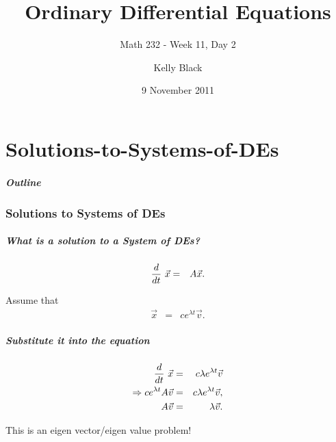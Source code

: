 \part{Solutions-to-Systems-of-DEs}


\title{Ordinary Differential Equations}
\subtitle{Math 232 - Week 11, Day 2}

\author{Kelly Black}
\date{9 November 2011}

\begin{frame}
  \titlepage
\end{frame}

\begin{frame}
  \frametitle{Outline}
\end{frame}


\section{Solutions to Systems of DEs}


\begin{frame}
  \frametitle{What is a solution to a System of DEs?}

  \begin{eqnarray*}
    \deriv{~}{t} \vec{x} & = & A \vec{x}.
  \end{eqnarray*}

  {
    Assume that 
    \begin{eqnarray*}
      \vec{x} & = & c e^{\lambda t} \vec{v}.
    \end{eqnarray*}
  }


\end{frame}


\begin{frame}
  \frametitle{Substitute it into the equation}

  \begin{eqnarray*}
    \deriv{~}{t} \vec{x} & = & c \lambda e^{\lambda t} \vec{v} \\
    \Rightarrow c  e^{\lambda t} A \vec{v} & = & c \lambda e^{\lambda t} \vec{v}, \\
    A \vec{v} & = & \lambda \vec{v}.
  \end{eqnarray*}

  This is an eigen vector/eigen value problem!

\end{frame}


